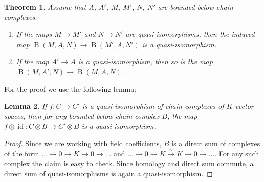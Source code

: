 \documentclass{scrartcl}
\theoremstyle{plain}
\newtheorem{theorem}{Theorem}[section]
\newtheorem{lemma}[theorem]{Lemma}
\theoremstyle{definition}
\let\xto\xrightarrow
\DeclareMathOperator{\id}{id}
\DeclareMathOperator{\BC}{B}
\begin{document}
\begin{theorem} \label{thm:bar-quiso} Assume that $A$, $A'$, $M$, $M'$, $N$, $N'$ are bounded below chain complexes.
    \begin{enumerate}
    \item If the maps $M\to M'$ and $N\to N'$ are quasi-isomorphisms, then the induced map $\BC(M, A, N)\to \BC(M', A, N')$ is a quasi-isomorphism.
    \item If the map $A'\to A$ is a quasi-isomorphism, then so is the map $\BC(M, A', N)\to \BC(M, A, N)$. 
    \end{enumerate}
\end{theorem}
For the proof we use the following lemma:
\begin{lemma} If $f\colon C\to C'$ is a quasi-isomorphism of chain complexes of $K$-vector spaces, then for any bounded below chain complex $B$, the map $f\otimes \id\colon C\otimes B\to C'\otimes B$ is a quasi-isomorphism. 
\end{lemma}
\begin{proof}
    Since we are working with field coefficients, $B$ is a direct sum of complexes of the form $\dots\to0\to K\to 0\to\dots$ and $\dots\to 0\to K\xto{\sim} K\to 0\to\dots$. For any such complex the claim is easy to check. Since homology and direct sum commute, a direct sum of quasi-isomorphisms is again a quasi-isomorphism.
\end{proof}
\end{document}
